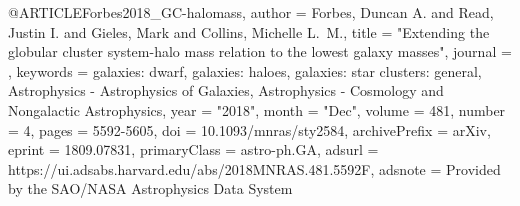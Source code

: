 \documentclass[apj]{emulateapj}
\begin{document}
{{@ARTICLE{Forbes2018_GC-halomass,
       author = {{Forbes}, Duncan A. and {Read}, Justin I. and {Gieles}, Mark and
         {Collins}, Michelle L.~M.},
        title = "{Extending the globular cluster system-halo mass relation to the lowest galaxy masses}",
      journal = {\mnras},
     keywords = {galaxies: dwarf, galaxies: haloes, galaxies: star clusters: general, Astrophysics - Astrophysics of Galaxies, Astrophysics - Cosmology and Nongalactic Astrophysics},
         year = "2018",
        month = "Dec",
       volume = {481},
       number = {4},
        pages = {5592-5605},
          doi = {10.1093/mnras/sty2584},
archivePrefix = {arXiv},
       eprint = {1809.07831},
 primaryClass = {astro-ph.GA},
       adsurl = {https://ui.adsabs.harvard.edu/abs/2018MNRAS.481.5592F},
      adsnote = {Provided by the SAO/NASA Astrophysics Data System}
}



}}
\end{document}
